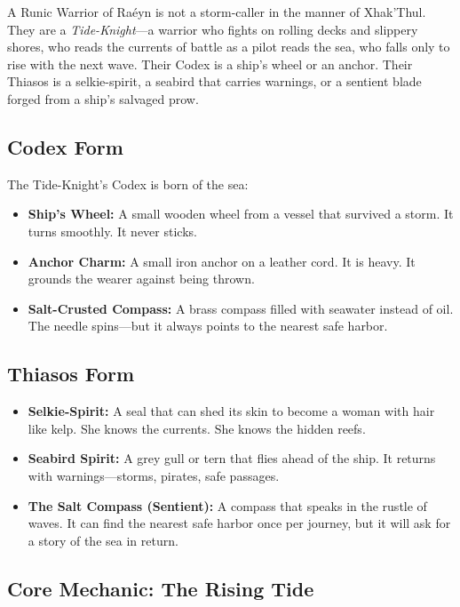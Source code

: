 A Runic Warrior of Raéyn is not a storm-caller in the manner of Xhak'Thul. They are a \textit{Tide-Knight}—a warrior who fights on rolling decks and slippery shores, who reads the currents of battle as a pilot reads the sea, who falls only to rise with the next wave. Their Codex is a ship's wheel or an anchor. Their Thiasos is a selkie-spirit, a seabird that carries warnings, or a sentient blade forged from a ship's salvaged prow.

\subsection{Codex Form}

The Tide-Knight's Codex is born of the sea:

\begin{itemize}
\item \textbf{Ship's Wheel:} A small wooden wheel from a vessel that survived a storm. It turns smoothly. It never sticks.
\item \textbf{Anchor Charm:} A small iron anchor on a leather cord. It is heavy. It grounds the wearer against being thrown.
\item \textbf{Salt-Crusted Compass:} A brass compass filled with seawater instead of oil. The needle spins—but it always points to the nearest safe harbor.
\end{itemize}

\subsection{Thiasos Form}

\begin{itemize}
\item \textbf{Selkie-Spirit:} A seal that can shed its skin to become a woman with hair like kelp. She knows the currents. She knows the hidden reefs.
\item \textbf{Seabird Spirit:} A grey gull or tern that flies ahead of the ship. It returns with warnings—storms, pirates, safe passages.
\item \textbf{The Salt Compass (Sentient):} A compass that speaks in the rustle of waves. It can find the nearest safe harbor once per journey, but it will ask for a story of the sea in return.
\end{itemize}

\subsection{Core Mechanic: The Rising Tide}

